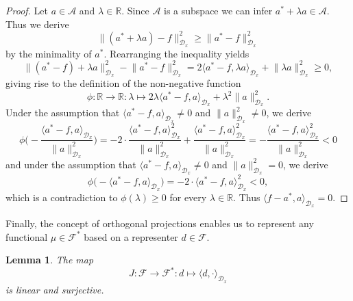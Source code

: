 \documentclass[11pt, a4paper]{article}
\newtheorem{lemma}[theorem]{Lemma}
\newcommand{\R}{\mathds{R}}
\newcommand{\A}{\mathcal{A}}
\newcommand{\D}{\mathcal{D}}
\newcommand{\F}{\mathcal{F}}
\begin{document}
\begin{proof}
Let $a \in \A$ and $\lambda \in \R$. Since $\A$ is a subspace we can infer $a^* + \lambda a \in \A$. Thus we derive
\[ \big \| (a^* + \lambda a) -f \big \|_{\D_x}^2 \geq \big \| a^* - f \big \|_{\D_x}^2 \]
by the minimality of $a^*$. Rearranging the inequality yields
\[ \big \| (a^* - f) + \lambda a \big \|_{\D_x} ^2 - \big \| a^* - f \big \|_{\D_x}^2 = 2 \big \langle a^* -f , \lambda a \big \rangle_{\D_x} + \big \| \lambda a \big \|_{\D_x}^2 \geq 0, \]
giving rise to the definition of the non-negative function
\[ \phi : \R \to \R : \lambda \mapsto 2 \lambda \big \langle a^* -f , a \big \rangle_{\D_x} + \lambda^2 \big \| a \big \|_{\D_x}^2. \]
Under the assumption that $\big \langle a^* - f , a \big \rangle_{\D_x} \neq 0$ and $\| a \|_{\D_x}^2 \neq 0$, we derive
\[ \phi \Big ( - \frac{ \big \langle a^* - f , a \big \rangle_{\D_x}}{\| a \|_{\D_x}^2} \Big ) = -2 \cdot \frac{ \big \langle a^* - f , a \big \rangle_{\D_x}^2}{ \| a \|_{\D_x}^2} + \frac{\big \langle a^* - f , a \big \rangle_{\D_x}^2}{ \| a \|_{\D_x}^2} = - \frac{ \big \langle a^* - f , a \big \rangle_{\D_x}^2}{ \| a \|_{\D_x}^2} < 0 \]
and under the assumption that $\big \langle a^* - f, a \big \rangle_{\D_x} \neq 0$ and $\| a \|_{\D_x}^2 = 0$, we derive
\[ \phi \Big ( -  \big \langle a^* - f , a \big \rangle_{\D_x} \Big ) = -2 \cdot \big \langle a^* - f , a \big \rangle_{\D_x}^2 < 0, \]
which is a contradiction to $\phi(\lambda) \geq 0$ for every $\lambda \in \R$. Thus $ \big \langle f - a^* , a \big \rangle_{\D_x} = 0$.
\end{proof}

Finally, the concept of orthogonal projections enables us to represent any functional $\mu \in \F^*$ based on a representer $d \in \F$.

\begin{lemma} \label{lem:riesz}
The map
\[ J: \F \to \F^* : d \mapsto \langle d, \cdot \rangle_{\D_x} \]
is linear and surjective.
\end{lemma}
\end{document}
